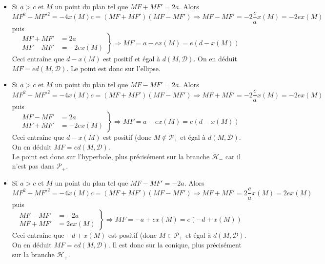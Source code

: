 \begin{itemize}
 \item Si $a>c$ et $M$ un point du plan tel que $MF+MF'=2a$. Alors
\begin{displaymath}
  MF^2 - MF'^2 = -4x(M)c = (MF + MF')(MF - MF') \Rightarrow
MF - MF' = -2\dfrac{c}{a}x(M)= -2ex(M)
\end{displaymath}
puis
\begin{displaymath}
 \left. 
\begin{aligned}
 MF+MF'&=2a \\
MF - MF' &= -2ex(M)
\end{aligned}
\right\rbrace \Rightarrow
MF = a-ex(M) = e(d-x(M))
\end{displaymath}
Ceci entraîne que $d-x(M)$ est positif et égal à $d(M,\mathcal D)$. On en déduit $MF=ed(M,\mathcal D)$.\newline
Le point est donc sur l'ellipse.

\item Si $a>c$ et $M$ un point du plan tel que $MF-MF'=2a$. Alors
\begin{displaymath}
  MF^2 - MF'^2 = -4x(M)c = (MF + MF')(MF - MF') \Rightarrow
MF + MF' = -2\dfrac{c}{a}x(M)= -2ex(M)
\end{displaymath}
puis
\begin{displaymath}
 \left. 
\begin{aligned}
 MF-MF'&=2a \\
MF + MF' &= -2ex(M)
\end{aligned}
\right\rbrace \Rightarrow
MF = a-ex(M) = e(d-x(M))
\end{displaymath}
Ceci entraîne que $d-x(M)$ est positif (donc $M \notin \mathcal P_+$ et égal à $d(M,\mathcal D)$. On en déduit $MF=ed(M,\mathcal D)$.\\
Le point est donc sur l'hyperbole, plus précisément sur la branche $\mathcal H_-$ car il n'est pas dans $\mathcal P_+$.

\item Si $a>c$ et $M$ un point du plan tel que $MF-MF'=-2a$. Alors
\begin{displaymath}
  MF^2 - MF'^2 = -4x(M)c = (MF + MF')(MF - MF') \Rightarrow
MF + MF' = 2\dfrac{c}{a}x(M)= 2ex(M)
\end{displaymath}
puis
\begin{displaymath}
 \left. 
\begin{aligned}
 MF-MF'&= -2a \\
MF + MF' &= 2ex(M)
\end{aligned}
\right\rbrace \Rightarrow
MF = -a+ex(M) = e(-d+x(M))
\end{displaymath}
Ceci entraîne que $-d+x(M)$ est positif (donc $M\in \mathcal P_+$ et égal à $d(M,\mathcal D)$. On en déduit $MF=ed(M,\mathcal D)$. Il est donc sur la conique, plus précisément sur la branche $\mathcal H_+$.
\end{itemize}
